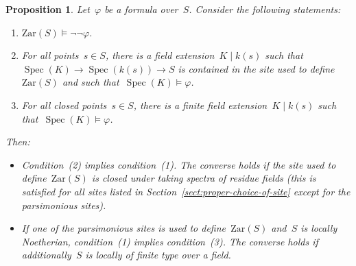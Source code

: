\documentclass[10pt,reqno,a4paper]{amsbook}
\theoremstyle{definition}
\theoremstyle{plain}
\newtheorem{prop}[defn]{Proposition}
\theoremstyle{remark}
\newcommand{\Zar}{\mathrm{Zar}}
\DeclareMathOperator{\Spec}{Spec}
\newcommand{\?}{\,{:}\,}
\renewcommand{\_}{\mathpunct{.}\,}
\newcommand{\fieldext}{\mathrel{|}}
\begin{document}
\begin{prop}\label{prop:notnot-in-big-zariski-topos}
Let~$\varphi$ be a formula over~$S$. Consider the following
statements:
\begin{enumerate}
\item $\Zar(S) \models \neg\neg\varphi$.
\item For all points~$s \in S$, there is a field extension~$K \fieldext k(s)$ such
that~$\Spec(K) \to \Spec(k(s)) \to S$ is contained in the site used to
define~$\Zar(S)$ and such that~$\Spec(K) \models \varphi$.
\item For all closed points~$s \in S$, there is a finite field extension~$K \fieldext
k(s)$ such that~$\Spec(K) \models \varphi$.
\end{enumerate}
Then:
\begin{itemize}
\item Condition~(2) implies condition~(1). The converse holds if the site used
to define~$\Zar(S)$ is closed under taking spectra of residue fields (this
is satisfied for all sites listed in Section~\ref{sect:proper-choice-of-site}
except for the parsimonious sites).
\item If one of the parsimonious sites is used to define~$\Zar(S)$ and~$S$ is
locally Noetherian, condition~(1) implies condition~(3). The converse holds if
additionally~$S$ is locally of finite type over a field.
\end{itemize}
\end{prop}
\end{document}
